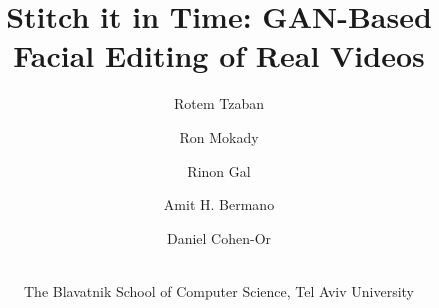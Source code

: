 \documentclass[10pt,twocolumn,letterpaper]{article}
\begin{document}
\title{
Stitch it in Time: GAN-Based Facial Editing of Real Videos}

\newcommand\myfigure{%

}

\author{Rotem Tzaban \and Ron Mokady \and Rinon Gal \and Amit H. Bermano \and Daniel Cohen-Or \and \\ The Blavatnik School of Computer Science, Tel Aviv University}


\maketitle

% 

\begin{abstract}


\end{abstract}

%     















\newpage



\end{document}
